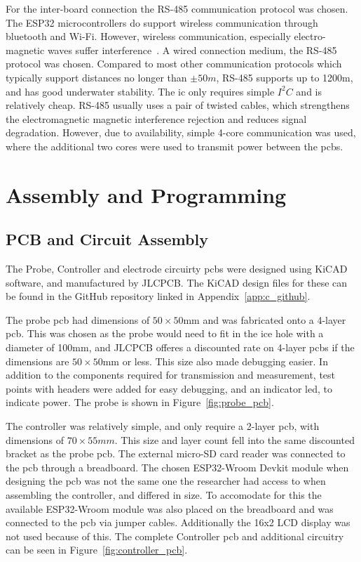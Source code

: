 For the inter-board connection the RS-485 communication protocol was chosen.
The ESP32 microcontrollers do support wireless communication through bluetooth and Wi-Fi.
However, wireless communication, especially electro-magnetic waves suffer interference~\cite{waves_in_water}.
A wired connection medium, the RS-485 protocol was chosen. 
Compared to most other communication protocols which typically support distances no longer than $\pm50m$, RS-485 supports up to 1200m, and has good underwater stability.
The \gls{ic} only requires simple $I^2C$ and is relatively cheap.
RS-485 usually uses a pair of twisted cables, which strengthens the electromagnetic magnetic interference rejection and reduces signal degradation.
However, due to availability, simple 4-core communication was used, where the additional two cores were used to transmit power between the \gls{pcb}s.

\section{Assembly and Programming}
\subsection{PCB and Circuit Assembly}
The Probe, Controller and electrode circuirty \gls{pcb}s were designed using KiCAD software, and manufactured by JLCPCB. The KiCAD design files for these can be found in the GitHub repository linked in Appendix~\ref{app:c_github}.

The probe \gls{pcb} had dimensions of $50\times50$mm and was fabricated onto a 4-layer \gls{pcb}.
This was chosen as the probe would need to fit in the ice hole with a diameter of 100mm, and JLCPCB offeres a discounted rate on 4-layer \gls{pcb}s if the dimensions are $50\times50$mm or less. 
This size also made debugging easier.
In addition to the components required for transmission and measurement, test points with headers were added for easy debugging, and an indicator \gls{led}, to indicate power.
The probe is shown in Figure~\ref{fig:probe_pcb}.



The controller was relatively simple, and only require a 2-layer \gls{pcb}, with dimensions of $70\times55mm$.
This size and layer count fell into the same discounted bracket as the probe \gls{pcb}.
The external micro-SD card reader was connected to the \gls{pcb} through a breadboard.
The chosen ESP32-Wroom Devkit module when designing the \gls{pcb} was not the same one the researcher had access to when assembling the controller, and differed in size.
To accomodate for this the available ESP32-Wroom module was also placed on the breadboard and was connected to the \gls{pcb} via jumper cables.
Additionally the 16x2 LCD display was not used because of this.
The complete Controller \gls{pcb} and additional circuitry can be seen in Figure~\ref{fig:controller_pcb}.

